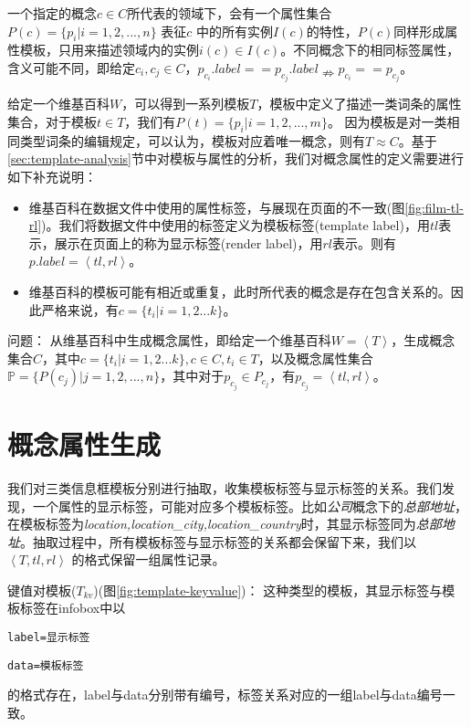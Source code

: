 一个指定的概念$c \in C$所代表的领域下，会有一个属性集合$P(c)=\{p_{i}|i=1,2,...,n\}$ 表征$c$ 中的所有实例$I(c)$的特性，$P(c)$同样形成属性模板，只用来描述领域内的实例$i(c) \in I(c)$。不同概念下的相同标签属性，含义可能不同，即给定$c_i,c_j \in C$，$p_{c_i}.label == p_{c_j}.label\nRightarrow p_{c_i} == p_{c_j}$。

给定一个维基百科$W$，可以得到一系列模板$T$，模板中定义了描述一类词条的属性集合，对于模板$t \in T$，我们有$P(t)=\{p_{i}|i=1,2,...,m\}$。
因为模板是对一类相同类型词条的编辑规定，可以认为，模板对应着唯一概念，则有$T \approx C$。基于\ref{sec:template-analysis}节中对模板与属性的分析，我们对概念属性的定义需要进行如下补充说明：
\begin{itemize}
\item 维基百科在数据文件中使用的属性标签，与展现在页面的不一致(图\ref{fig:film-tl-rl})。我们将数据文件中使用的标签定义为模板标签(template label)，用$tl$表示，展示在页面上的称为显示标签(render label)，用$rl$表示。则有$p.label = \left< tl, rl \right>$。
\item 维基百科的模板可能有相近或重复，此时所代表的概念是存在包含关系的。因此严格来说，有$c = \{t_i|i=1,2...k\}$。
\end{itemize}

\begin{definition}
{\heiti 问题：} 
从维基百科中生成概念属性，即给定一个维基百科$W = \left< T \right>$，生成概念集合$C$，其中$c = \{t_i|i=1,2...k\}, c \in C, t_i \in T$，以及概念属性集合$\mathbb{P} = \{P(c_j)| j = 1,2,...,n\}$，其中对于$p_{c_j} \in P_{c_j}$，有$p_{c_j} = \left< tl, rl \right>$。
\end{definition}

\section{概念属性生成}
\label{sec:property-extraction}

我们对三类信息框模板分别进行抽取，收集模板标签与显示标签的关系。我们发现，一个属性的显示标签，可能对应多个模板标签。比如\textit{公司}概念下的\textit{总部地址}，在模板标签为\textit{location,location\_city,location\_country}时，其显示标签同为\textit{总部地址}。抽取过程中，所有模板标签与显示标签的关系都会保留下来，我们以$\left< T, tl, rl \right>$ 的格式保留一组属性记录。

{\heiti 键值对模板($T_{kv}$)(图\ref{fig:template-keyvalue})：} 这种类型的模板，其显示标签与模板标签在infobox中以

\begin{center}
\verb"label=显示标签"

\verb"data=模板标签"
\end{center}
的格式存在，label与data分别带有编号，标签关系对应的一组label与data编号一致。

